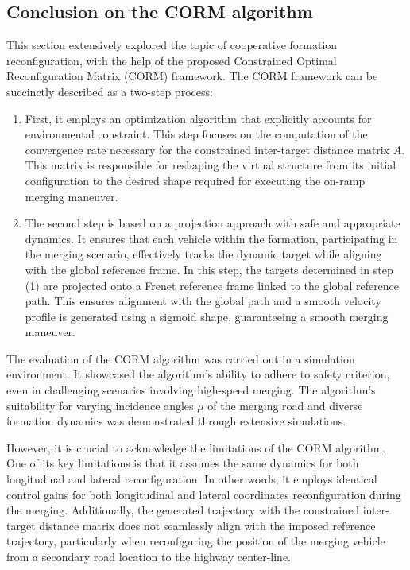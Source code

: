 \subsection{Conclusion on the CORM algorithm}\label{sec:CORM_conclusion}
This section extensively explored the topic of cooperative formation reconfiguration, with the help of the proposed Constrained Optimal Reconfiguration Matrix (CORM) framework. The CORM framework can be succinctly described as a two-step process: 

\begin{enumerate}
    \item First, it employs an optimization algorithm that explicitly accounts for environmental constraint. This step focuses on the computation of the convergence rate necessary for the constrained inter-target distance matrix $A$. This matrix is responsible for reshaping the virtual structure from its initial configuration to the desired shape required for executing the on-ramp merging maneuver. 

    \item The second step is based on a projection approach with safe and appropriate dynamics. It ensures that each vehicle within the formation, participating in the merging scenario, effectively tracks the dynamic target while aligning with the global reference frame. In this step, the targets determined in step (1) are projected onto a Frenet reference frame linked to the global reference path. This ensures alignment with the global path and a smooth velocity profile is generated using a sigmoid shape, guaranteeing a smooth merging maneuver. 
\end{enumerate}


The evaluation of the CORM algorithm was carried out in a simulation environment. It showcased the algorithm's ability to adhere to safety criterion, even in challenging scenarios involving high-speed merging. The algorithm's suitability for varying incidence angles $\mu$ of the merging road and diverse formation dynamics was demonstrated through extensive simulations.


However, it is crucial to acknowledge the limitations of the CORM algorithm. One of its key limitations is that it assumes the same dynamics for both longitudinal and lateral reconfiguration. In other words, it employs identical control gains for both longitudinal and lateral coordinates reconfiguration during the merging. Additionally, the generated trajectory with the constrained inter-target distance matrix does not seamlessly align with the imposed reference trajectory, particularly when reconfiguring the position of the merging vehicle from a secondary road location to the highway center-line.

